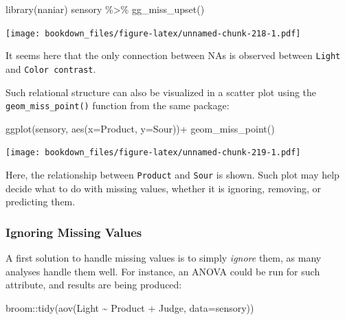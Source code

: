 \documentclass[
]{krantz}
\makeatletter
\newenvironment{Shaded}{\begin{snugshade}}{\end{snugshade}}
\newcommand{\AttributeTok}[1]{\textcolor[rgb]{0.61,0.61,0.61}{#1}}
\newcommand{\FunctionTok}[1]{\textcolor[rgb]{0,0,0}{#1}}
\newcommand{\NormalTok}[1]{#1}
\newcommand{\SpecialCharTok}[1]{\textcolor[rgb]{0,0,0}{#1}}
\newenvironment{kframe}{%
\medskip{}
\setlength{\fboxsep}{.8em}
 \def\at@end@of@kframe{}%
 \ifinner\ifhmode%
  \def\at@end@of@kframe{\end{minipage}}%
  \begin{minipage}{\columnwidth}%
 \fi\fi%
 \def\FrameCommand##1{\hskip\@totalleftmargin \hskip-\fboxsep
 \colorbox{shadecolor}{##1}\hskip-\fboxsep
     \hskip-\linewidth \hskip-\@totalleftmargin \hskip\columnwidth}%
 \MakeFramed {\advance\hsize-\width
   \@totalleftmargin\z@ \linewidth\hsize
   \@setminipage}}%
 {\par\unskip\endMakeFramed%
 \at@end@of@kframe}
\renewenvironment{Shaded}{\begin{kframe}}{\end{kframe}}
\makeatother
\begin{document}
\begin{Shaded}
\begin{Highlighting}[]
\FunctionTok{library}\NormalTok{(naniar)}
\NormalTok{sensory }\SpecialCharTok{\%\textgreater{}\%}
  \FunctionTok{gg\_miss\_upset}\NormalTok{()}
\end{Highlighting}
\end{Shaded}

\texttt{[image: bookdown\_files/figure-latex/unnamed-chunk-218-1.pdf]}

It seems here that the only connection between NAs is observed between \texttt{Light} and \texttt{Color\ contrast}.

Such relational structure can also be visualized in a scatter plot using the \texttt{geom\_miss\_point()} function from the same package:

\begin{Shaded}
\begin{Highlighting}[]
\FunctionTok{ggplot}\NormalTok{(sensory, }\FunctionTok{aes}\NormalTok{(}\AttributeTok{x=}\NormalTok{Product, }\AttributeTok{y=}\NormalTok{Sour))}\SpecialCharTok{+}
  \FunctionTok{geom\_miss\_point}\NormalTok{()}
\end{Highlighting}
\end{Shaded}

\texttt{[image: bookdown\_files/figure-latex/unnamed-chunk-219-1.pdf]}

Here, the relationship between \texttt{Product} and \texttt{Sour} is shown. Such plot may help decide what to do with missing values, whether it is ignoring, removing, or predicting them.

\hypertarget{ignoring-missing-values}{%
\subsubsection{Ignoring Missing Values}\label{ignoring-missing-values}}

A first solution to handle missing values is to simply \emph{ignore} them, as many analyses handle them well. For instance, an ANOVA could be run for such attribute, and results are being produced:

\begin{Shaded}
\begin{Highlighting}[]
\NormalTok{broom}\SpecialCharTok{::}\FunctionTok{tidy}\NormalTok{(}\FunctionTok{aov}\NormalTok{(Light }\SpecialCharTok{\textasciitilde{}}\NormalTok{ Product }\SpecialCharTok{+}\NormalTok{ Judge, }\AttributeTok{data=}\NormalTok{sensory))}
\end{Highlighting}
\end{Shaded}
\end{document}
